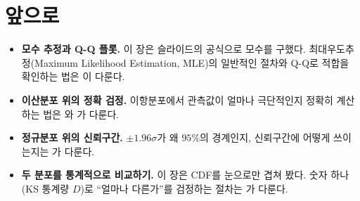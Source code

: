 \section{앞으로}
\label{sec:dist-future}

\begin{itemize}
  \item \textbf{모수 추정과 Q-Q 플롯.} 이 장은 슬라이드의 공식으로
        모수를 구했다. 최대우도추정(Maximum Likelihood Estimation, MLE)의
        일반적인 절차와 Q-Q로 적합을
        확인하는 법은 이 다룬다.
  \item \textbf{이산분포 위의 정확 검정.} 이항분포에서 관측값이 얼마나
        극단적인지 정확히 계산하는 법은 와
        가 다룬다.
  \item \textbf{정규분포 위의 신뢰구간.} $\pm 1.96\sigma$가 왜 $95\%$의
        경계인지, 신뢰구간에 어떻게 쓰이는지는 가 다룬다.
  \item \textbf{두 분포를 통계적으로 비교하기.} 이 장은 CDF를 눈으로만
        겹쳐 봤다. 숫자 하나(KS 통계량 $D$)로 ``얼마나 다른가''를
        검정하는 절차는 가 다룬다.
\end{itemize}
